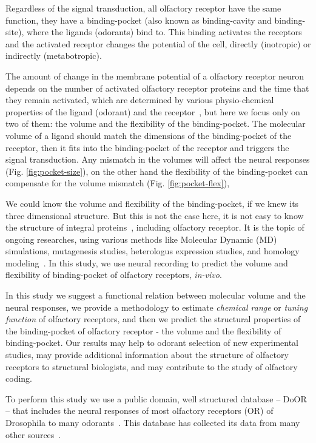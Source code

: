 \documentclass[11pt]{paper} %
\begin{document}
Regardless of the signal transduction, 
all olfactory receptor have the same function, they have a binding-pocket (also known as binding-cavity and binding-site),
where the ligands (odorants) bind to. 
This binding activates the receptors and
the activated receptor changes the potential of the cell, directly (inotropic) or indirectly (metabotropic).

The amount of change in the membrane potential of a olfactory receptor neuron depends on the number of activated olfactory receptor proteins and the time that they remain activated,
which are determined by various physio-chemical properties of the ligand (odorant) and the receptor~\cite{Turin,Araneda2000,Gabler2013}, 
but here we focus only on two of them: the volume and the flexibility of the binding-pocket.
The molecular volume of a ligand should match the dimensions of the binding-pocket of the receptor,
then it fits into the binding-pocket of the receptor and triggers the signal transduction. 
Any mismatch in the volumes will affect the neural responses (Fig. \ref{fig:pocket-size}), 
on the other hand the flexibility of the binding-pocket can compensate for the volume mismatch (Fig. \ref{fig:pocket-flex}),

We could know the volume and flexibility of the binding-pocket, if we knew its three dimensional structure.
But this is not the case here, it is not easy to know the structure of integral proteins~\cite{Zhang2008,Lupieri2009}, 
including olfactory receptor. It is the topic of ongoing researches, 
using various methods like Molecular Dynamic (MD) simulations,
 mutagenesis studies, heterologus expression studies, and homology modeling~\cite{Khafizov2007,Man2004,Lai2005,Vaidehi2002,Floriano2004,Schmiedeberg2007,Katada2005,Kato2008,Rospars2013}.
In this study, we use neural recording to predict the volume and flexibility of binding-pocket of olfactory receptors, {\it in-vivo}.

In this study we suggest a functional relation between molecular volume and the neural responses, 
we provide a methodology to estimate {\it chemical range} or {\it tuning function} of olfactory receptors,
and then we predict the structural properties of the binding-pocket of olfactory receptor - the volume and the flexibility of binding-pocket.
Our results may help to odorant selection  of new experimental studies, 
may provide additional information about the structure of olfactory receptors to structural biologists, 
and may contribute to the study of olfactory coding.

To perform this study we use a public domain, well structured database -- DoOR -- 
that includes the neural responses of most olfactory receptors (OR) of Drosophila to many odorants~\cite{Galizia2010}. 
This database has collected its data from many other sources~\cite{Bruyne1999,Bruyne2001,Dobritsa2003,Goldman2005,Hallem2004,Hallem2006,
Kreher2005,Kreher2008,Kwon2007,Pelz2006,Pelz2006,Schmuker2007,Stensmyr2003,
Turner2009,VanderGoesvanNaters2007,Yao2005}.
\end{document}
